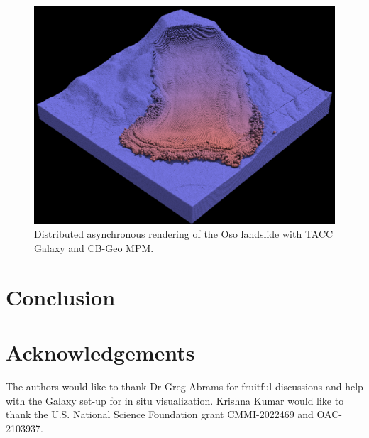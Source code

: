 \documentclass{vgtc}
\begin{document}
\begin{figure}
    \centering
    \includegraphics[width=\linewidth]{figs/oso.png}
    \caption{Distributed asynchronous rendering of the Oso landslide with TACC Galaxy and CB-Geo MPM.}
    \label{fig:oso}
\end{figure}

\section{Conclusion}
\label{sec:conclusion}

\section{Acknowledgements}
\label{sec:ack}
The authors would like to thank Dr Greg Abrams for fruitful discussions and help with the Galaxy set-up for in situ visualization. Krishna Kumar would like to thank the U.S. National Science Foundation grant CMMI-2022469 and OAC-2103937.


\end{document}
